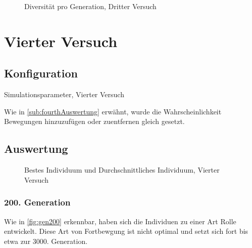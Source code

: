           \begin{figure}
            \centering
            
            \caption{Diversität pro Generation, Dritter Versuch\label{fig:graphDivThird}}
          \end{figure}

      \section{Vierter Versuch}

        \subsection{Konfiguration}

          \begin{table}[H]
            \centering
            
            \caption{Simulationsparameter, Vierter Versuch \label{tbl:forthRunConf}}
          \end{table}

          Wie in \vref{sub:fourthAuswertung} erwähnt, wurde die Wahrscheinlichkeit Bewegungen hinzuzufügen oder zuentfernen gleich gesetzt.

        \subsection{Auswertung}

          \begin{figure}[H]
            \centering
            
            \caption{Bestes Individuum und Durchschnittliches Individuum, Vierter Versuch\label{fig:graphFourth}}
          \end{figure}

          \subsubsection{200. Generation}
            Wie in \vref{fig:gen200} erkennbar, haben sich die Individuen zu einer Art Rolle entwickelt.
            Diese Art von Fortbewgung ist nicht optimal und setzt sich fort bis etwa zur 3000. Generation.

            \vspace{0.5cm}

